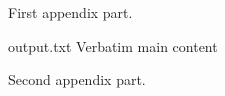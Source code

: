 \documentclass{article}
\begin{document}
\begin{toappendix}
First appendix part.
\end{toappendix}  

\begin{VerbatimOut}{output.txt}
Verbatim main content
\end{VerbatimOut}


\begin{toappendix}
Second appendix part.
\end{toappendix}  
\end{document}
